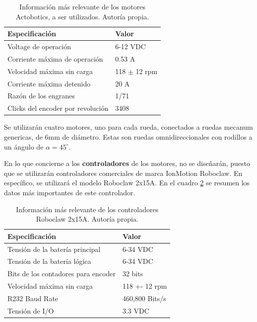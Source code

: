 \begin{table}[H]
\caption{Información más relevante de los motores Actobotics, a ser utilizados. Autoría propia.}
\begin{tabular}{|l|l|}
\hline
Especificación                & Valor         \\ \hline
Voltage de operación          & 6-12 VDC      \\ \hline
Corriente máxima de operación & 0.53 A        \\ \hline
Velocidad máxima sin carga    & 118 $\pm$ 12 rpm \\ \hline
Corriente máxima detenido     & 20 A          \\ \hline
Razón de los engranes         & 1/71          \\ \hline
Clicks del encoder por revolución & 3408      \\ \hline
\end{tabular}
\label{T:actobotics}
\end{table}

Se utilizarán cuatro motores, uno para cada rueda, conectados a ruedas mecanum genericas, de 6mm de diámetro. Estas son ruedas omnidireccionales con rodillos a un ángulo de $\alpha = 45^\circ$.

En lo que concierne a los \textbf{controladores} de los motores, no se diseñarán, puesto que se utilizarán controladores comerciales de marca IonMotion Roboclaw. En específico, se utilizará el modelo Roboclaw 2x15A. En el cuadro \ref{T:roboclaw} se resumen los datos más importantes de este controlador.

\begin{table}[H]
\caption{Información más relevante de los controladores Roboclaw 2x15A. Autoría propia.}
\begin{tabular}{|l|l|}
\hline
Especificación                      & Valor          \\ \hline
Tensión de la batería principal     & 6-34 VDC       \\ \hline
Tensión de la batería lógica        & 6-34 VDC       \\ \hline
Bits de los contadores para encoder & 32 bits        \\ \hline
Velocidad máxima sin carga          & 118 +- 12 rpm  \\ \hline
R232 Baud Rate                      & 460,800 Bits/s \\ \hline
Tensión de I/O                      & 3.3 VDC        \\ \hline
\end{tabular}
\label{T:roboclaw}
\end{table}

